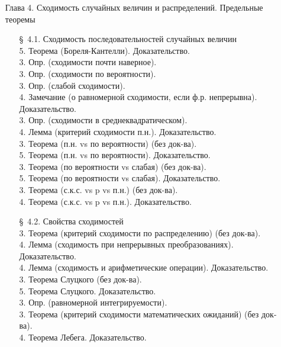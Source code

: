 \documentclass[10pt]{amsart}
\begin{document}
\begin{enumerate}
\begin{enumerate}
\end{enumerate}
    
    
\item[Глава 4.] Сходимость случайных величин и распределений. Предельные теоремы \\
\begin{enumerate}
\item[\S\, 4.1.] Сходимость последовательностей случайных величин \\
5. Теорема (Бореля-Кантелли). Доказательство. \\
3. Опр. (сходимости почти наверное). \\
3. Опр. (сходимости по вероятности). \\
3. Опр. (слабой сходимости). \\
4. Замечание (о равномерной сходимости, если ф.р. непрерывна). Доказательство. \\
3. Опр. (сходимости в среднеквадратическом). \\
4. Лемма (критерий сходимости п.н.). Доказательство. \\
3. Теорема (п.н. vs по вероятности)  (без док-ва). \\
5. Теорема (п.н. vs по вероятности). Доказательство. \\
3. Теорема (по вероятности vs слабая) (без док-ва). \\  
5. Теорема (по вероятности vs слабая). Доказательство. \\  
3. Теорема (с.к.с. vs p vs п.н.) (без док-ва). \\ 
4. Теорема (с.к.с. vs p vs п.н.). Доказательство. \\ 

        
        
\item[\S\, 4.2.] Свойства сходимостей \\
        
3. Теорема (критерий сходимости по распределению) (без док-ва). \\
4. Лемма  (сходимость при непрерывных преобразованиях). Доказательство. \\
4. Лемма (сходимость и арифметические операции). Доказательство. \\
3. Теорема Слуцкого (без док-ва). \\
5. Теорема Слуцкого. Доказательство. \\
3. Опр. (равномерной интегрируемости). \\
3. Теорема (критерий сходимости математических ожиданий) (без док-ва). \\
4. Теорема Лебега. Доказательство. \\


\end{enumerate}
\end{enumerate}
\end{document}
